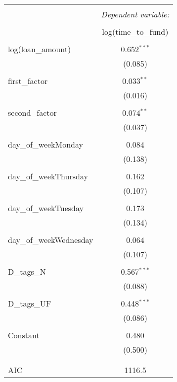 
\begin{table}[!htbp] \centering 
  \caption{} 
  \label{} 
\begin{tabular}{@{\extracolsep{5pt}}lc} 
\\[-1.8ex]\hline 
\hline \\[-1.8ex] 
 & \multicolumn{1}{c}{\textit{Dependent variable:}} \\ 
\cline{2-2} 
\\[-1.8ex] & log(time\_to\_fund) \\ 
\hline \\[-1.8ex] 
 log(loan\_amount) & 0.652$^{***}$ \\ 
  & (0.085) \\ 
  & \\ 
 first\_factor & 0.033$^{**}$ \\ 
  & (0.016) \\ 
  & \\ 
 second\_factor & 0.074$^{**}$ \\ 
  & (0.037) \\ 
  & \\ 
 day\_of\_weekMonday & 0.084 \\ 
  & (0.138) \\ 
  & \\ 
 day\_of\_weekThursday & 0.162 \\ 
  & (0.107) \\ 
  & \\ 
 day\_of\_weekTuesday & 0.173 \\ 
  & (0.134) \\ 
  & \\ 
 day\_of\_weekWednesday & 0.064 \\ 
  & (0.107) \\ 
  & \\ 
 D\_tags\_N & 0.567$^{***}$ \\ 
  & (0.088) \\ 
  & \\ 
 D\_tags\_UF & 0.448$^{***}$ \\ 
  & (0.086) \\ 
  & \\ 
 Constant & 0.480 \\ 
  & (0.500) \\ 
  & \\ 
\hline \\[-1.8ex] 
AIC & 1116.5 \\ 

\end{tabular}
\end{table}
